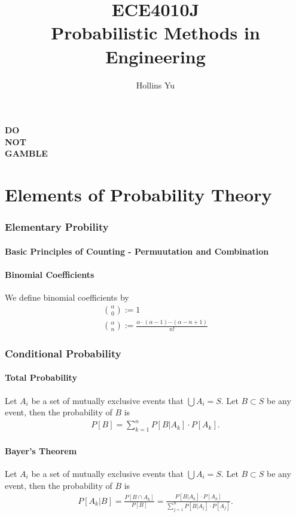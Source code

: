 \documentclass[11pt,a4paper]{article}
\begin{document}
\author{Hollins Yu}
\title{\bf  ECE4010J \\ \LARGE Probabilistic Methods in Engineering}
\maketitle

\newpage
\tableofcontents

\newpage
\noindent
{\fontsize{40pt}{20}\bf\color[RGB]{255,0,0}DO\\NOT\\GAMBLE}
\newpage

\part{Elements of Probability Theory}
\section{Elementary Probility}

\subsection{Basic Principles of Counting - Permuutation and Combination}

\subsection{Binomial Coefficients}
We define binomial coefficients by
\begin{gather}
    \binom{\alpha}{0} := 1 \\
    \binom{\alpha}{n}:=\frac{\alpha\cdot(\alpha-1)\cdots(\alpha-n+1)}{n!}
\end{gather}

\section{Conditional Probability}
\subsection{Total Probability}
Let $A_i$ be a set of mutually exclusive events that $\bigcup A_i=S$.
Let $B\subset S$ be any event, then the probability of $B$ is
\begin{gather}
    P[B]=\sum_{k=1}^{n}P[B|A_k]\cdot P[A_k].
\end{gather}
\subsection{Bayer's Theorem}
Let $A_i$ be a set of mutually exclusive events that $\bigcup A_i=S$.
Let $B\subset S$ be any event, then the probability of $B$ is
\begin{gather}
    P[A_k|B]=\frac{P[B\cap A_k]}{P[B]}=\frac{P[B| A_k]\cdot P[A_k]}{\sum_{j=1}^{n}P[B| A_j]\cdot P[A_j]}.
\end{gather}
\end{document}
